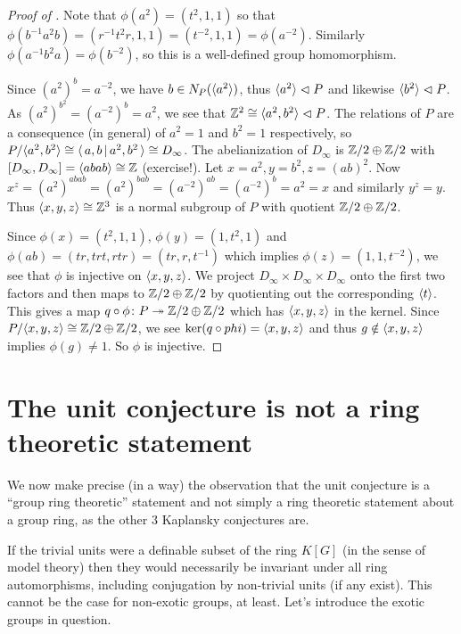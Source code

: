 \begin{proof}[Proof of ]
    Note that $\phi(a^2) = (t^2, 1, 1)$ so that $\phi(b^{-1} a^2 b) = (r^{-1} t^2 r, 1, 1) = (t^{-2}, 1, 1) = \phi(a^{-2})$.
    Similarly $\phi(a^{-1} b^2 a) = \phi(b^{-2})$, so this is a well-defined group homomorphism.

    Since $(a^2)^b = a^{-2}$, we have $b \in N_P(\langle a^2 \rangle)$, thus $\langle a^2 \rangle \vartriangleleft P$ and likewise $\langle b^2 \rangle \vartriangleleft P$.
    As $(a^2)^{b^2} = (a^{-2})^b = a^2$, we see that $\mathbb{Z}^2 \cong \langle a^2, b^2 \rangle \vartriangleleft P$.
    The relations of $P$ are a consequence (in general) of $a^2 = 1$ and $b^2 = 1$ respectively, so $P / \langle a^2, b^2 \rangle \cong \langle \, a, b \, | \, a^2, b^2 \, \rangle \cong D_\infty$.
    The abelianization of $D_\infty$ is $\mathbb{Z}/2 \oplus \mathbb{Z}/2$ with $[D_\infty, D_\infty] = \langle abab \rangle \cong \mathbb{Z}$ (exercise!).
    Let $x = a^2, y = b^2, z = (ab)^2$.
    Now $x^z = (a^2)^{abab} = (a^2)^{bab} = (a^{-2})^{ab} = (a^{-2})^b = a^2 = x$ and similarly $y^z = y$.
    Thus $\langle x, y, z \rangle \cong \mathbb{Z}^3$ is a normal subgroup of $P$ with quotient $\mathbb{Z}/2 \oplus \mathbb{Z}/2$.

    Since $\phi(x) = (t^2, 1, 1)$, $\phi(y) = (1, t^2, 1)$ and $\phi(ab) = (tr, trt, rtr) = (tr, r, t^{-1})$ which implies $\phi(z) = (1, 1, t^{-2})$, we see that $\phi$ is injective on $\langle x, y, z \rangle$.
    We project $D_\infty \times D_\infty \times D_\infty$ onto the first two factors and then maps to $\mathbb{Z}/2 \oplus \mathbb{Z}/2$ by quotienting out the corresponding $\langle t \rangle$.
    This gives a map $q \circ \phi \colon P \twoheadrightarrow \mathbb{Z}/2 \oplus \mathbb{Z}/2$ which has $\langle x, y, z \rangle$ in the kernel.
    Since $P / \langle x, y, z \rangle \cong \mathbb{Z}/2 \oplus \mathbb{Z}/2$, we see $\ker (q \circ phi) = \langle x, y, z \rangle$ and thus $g \notin \langle x, y, z \rangle$ implies $\phi(g) \neq 1$.
    So $\phi$ is injective.
\end{proof}

\section{The unit conjecture is not a ring theoretic statement}

We now make precise (in a way) the observation that the unit conjecture is a ``group ring theoretic'' statement and not simply a ring theoretic statement about a group ring, as the other $3$ Kaplansky conjectures are.

If the trivial units were a definable subset of the ring $K[G]$ (in the sense of model theory) then they would necessarily be invariant under all ring automorphisms, including conjugation by non-trivial units (if any exist).
This cannot be the case for non-exotic groups, at least.
Let's introduce the exotic groups in question.

